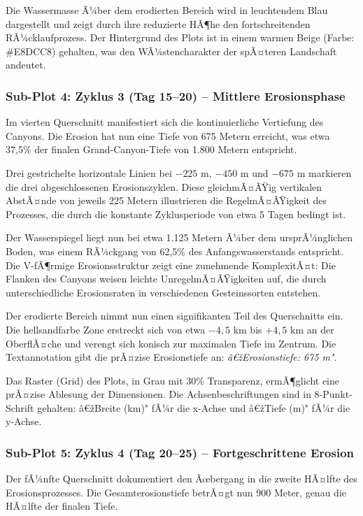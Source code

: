 Die Wassermasse Ã¼ber dem erodierten Bereich wird in leuchtendem Blau dargestellt und zeigt durch ihre reduzierte HÃ¶he den fortschreitenden RÃ¼cklaufprozess. Der Hintergrund des Plots ist in einem warmen Beige (Farbe: \#E8DCC8) gehalten, was den WÃ¼stencharakter der spÃ¤teren Landschaft andeutet.

\subsubsection*{Sub-Plot 4: Zyklus 3 (Tag 15--20) -- Mittlere Erosionsphase}

Im vierten Querschnitt manifestiert sich die kontinuierliche Vertiefung des Canyons. Die Erosion hat nun eine Tiefe von 675 Metern erreicht, was etwa 37,5\% der finalen Grand-Canyon-Tiefe von 1.800 Metern entspricht.

Drei gestrichelte horizontale Linien bei $-225$ m, $-450$ m und $-675$ m markieren die drei abgeschlossenen Erosionszyklen. Diese gleichmÃ¤ÃŸig vertikalen AbstÃ¤nde von jeweils 225 Metern illustrieren die RegelmÃ¤ÃŸigkeit des Prozesses, die durch die konstante Zyklusperiode von etwa 5 Tagen bedingt ist.

Der Wasserspiegel liegt nun bei etwa 1.125 Metern Ã¼ber dem ursprÃ¼nglichen Boden, was einem RÃ¼ckgang von 62,5\% des Anfangswasserstands entspricht. Die V-fÃ¶rmige Erosionsstruktur zeigt eine zunehmende KomplexitÃ¤t: Die Flanken des Canyons weisen leichte UnregelmÃ¤ÃŸigkeiten auf, die durch unterschiedliche Erosionsraten in verschiedenen Gesteinssorten entstehen.

Der erodierte Bereich nimmt nun einen signifikanten Teil des Querschnitts ein. Die hellsandfarbe Zone erstreckt sich von etwa $-4,5$ km bis $+4,5$ km an der OberflÃ¤che und verengt sich konisch zur maximalen Tiefe im Zentrum. Die Textannotation gibt die prÃ¤zise Erosionstiefe an: \textit{â€žErosionstiefe: 675 m"}.

Das Raster (Grid) des Plots, in Grau mit 30\% Transparenz, ermÃ¶glicht eine prÃ¤zise Ablesung der Dimensionen. Die Achsenbeschriftungen sind in 8-Punkt-Schrift gehalten: â€žBreite (km)" fÃ¼r die x-Achse und â€žTiefe (m)" fÃ¼r die y-Achse.

\subsubsection*{Sub-Plot 5: Zyklus 4 (Tag 20--25) -- Fortgeschrittene Erosion}

Der fÃ¼nfte Querschnitt dokumentiert den Ãœbergang in die zweite HÃ¤lfte des Erosionsprozesses. Die Gesamterosionstiefe betrÃ¤gt nun 900 Meter, genau die HÃ¤lfte der finalen Tiefe.

